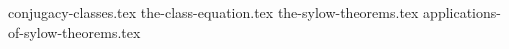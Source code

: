 \setcounter{chapter}{24}
\setcounter{section}{0}
{conjugacy-classes.tex}
{the-class-equation.tex}
{the-sylow-theorems.tex}
{applications-of-sylow-theorems.tex}
